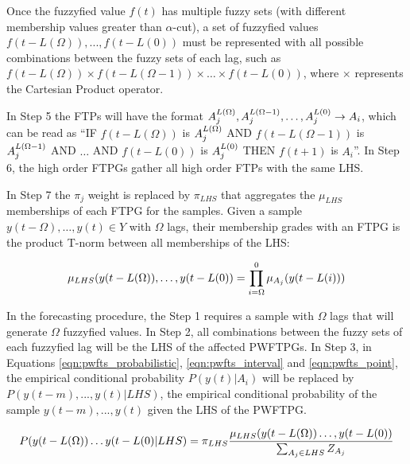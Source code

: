 Once the fuzzyfied value $f(t)$ has multiple fuzzy sets (with different membership values greater than $\alpha$-cut), a set of fuzzyfied values $f(t-L(\Omega)),...,f(t-L(0))$ must be represented with all possible combinations between the fuzzy sets of each lag, such as $f(t-L(\Omega)) \times f(t - L(\Omega-1)) \times \ldots \times f(t-L(0))$, where $\times$ represents the Cartesian Product operator. 

In Step 5 the FTPs will have the format $A_j^{L(\Omega)}, A_j^{L(\Omega-1)},\ldots,A_j^{L(0)} \rightarrow A_i$, which can be read as ``IF $f(t-L(\Omega))$ is $A_j^{L(\Omega)}$ AND $f(t-L(\Omega-1))$ is $A_j^{L(\Omega-1)}$ AND $\dots$ AND $f(t-L(0))$ is $A_j^{L(0)}$ THEN $f(t+1)$ is $A_i$''. In Step 6, the high order FTPGs gather all high order FTPs with the same LHS. 

In Step 7 the $\pi_j$ weight is replaced by $\pi_{LHS}$ that aggregates the $\mu_{LHS}$ memberships of each FTPG for the samples. Given a sample $y(t-\Omega),\dots,y(t) \in Y$ with $\Omega$ lags, their membership grades with an FTPG is the product T-norm between all memberships of the LHS: 

\begin{equation}
\displaystyle  \mu_{LHS}(y(t-L(\Omega)),\ldots,y(t-L(0)) = \prod_{i = \Omega}^0 \mu_{A_j}(y(t-L(i)))
\label{eqn:extension_highorder_mu}
\end{equation}

In the forecasting procedure, the Step 1 requires a sample with $\Omega$ lags that will generate $\Omega$ fuzzyfied values. In Step 2, all combinations between the fuzzy sets of each fuzzyfied lag will be the LHS of the affected PWFTPGs. In Step 3, in Equations \eqref{eqn:pwfts_probabilistic}, \eqref{eqn:pwfts_interval} and \eqref{eqn:pwfts_point}, the empirical conditional probability $P(y(t)|A_i)$ will be replaced by $P(y(t-m),...,y(t) | LHS)$, the empirical conditional probability of the sample $y(t-m),...,y(t)$ given the LHS of the PWFTPG.

\begin{equation}
\displaystyle P(y(t-L(\Omega))\ldots y(t-L(0) | LHS) = \pi_{LHS} \frac{\mu_{LHS}(y(t-L(\Omega))\ldots,y(t-L(0))}{\sum_{A_j \in LHS} Z_{A_j}}
\label{eqn:extension_highorder}
\end{equation}



